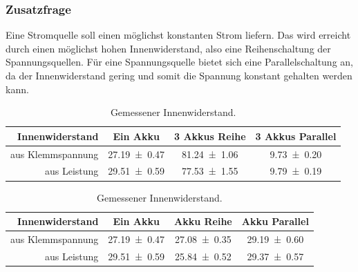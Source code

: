 \documentclass[
	a4paper,
	12pt,
	pagesize,
	ngerman
]{scrartcl}
\begin{document}
	\subsubsection*{Zusatzfrage}
	Eine Stromquelle soll einen möglichst konstanten Strom liefern. Das wird erreicht durch einen möglichst hohen Innenwiderstand, also eine Reihenschaltung der Spannungsquellen. Für eine Spannungsquelle bietet sich eine Parallelschaltung an, da der Innenwiderstand gering und somit die Spannung konstant gehalten werden kann.
	\begin{table}[tb]
		\centering
		\begin{tabular}{ r | c | c | c}
			Innenwiderstand& Ein Akku & 3 Akkus Reihe & 3 Akkus Parallel \\ \hline
			aus Klemmspannung& \SI{27,19 \pm 0,47 }{\Omega}& \SI{81,24 \pm 1,06 }{\Omega}&  \SI{9,73 \pm 0,20 }{\Omega} \\
			aus Leistung & \SI{29,51 \pm 0,59 }{\Omega}&  \SI{77,53 \pm 1,55 }{\Omega}&  \SI{9,79 \pm 0,19 }{\Omega}\\

		\end{tabular}
		\caption{Gemessener Innenwiderstand.} %
		\label{Tabelle_Innenwiderstaende} 
	\end{table}
	\begin{table}[tb]
		\centering
		\begin{tabular}{ r | c | c | c}
			Innenwiderstand& Ein Akku & Akku Reihe & Akku Parallel \\ \hline
			aus Klemmspannung& \SI{27,19 \pm 0,47 }{\Omega}& \SI{27,08 \pm 0,35 }{\Omega}&  \SI{29,19 \pm 0,60 }{\Omega} \\
			aus Leistung & \SI{29,51 \pm 0,59 }{\Omega}&  \SI{25,84 \pm 0,52 }{\Omega}&  \SI{29,37 \pm 0,57 }{\Omega}\\

		\end{tabular}
		\caption{Gemessener Innenwiderstand.} %
		\label{Tabelle_Innenwiderstaende2} 
	\end{table}
\end{document}
